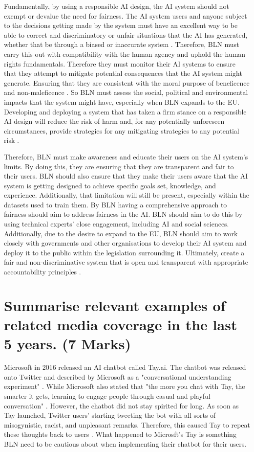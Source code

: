 \documentclass[a4paper,10pt]{article}
\begin{document}
	Fundamentally, by using a responsible AI design, the AI system should not exempt or devalue the need for fairness. The AI system users and anyone subject to the decisions getting made by the system must have an excellent way to be able to correct and discriminatory or unfair situations that the AI has generated, whether that be through a biased or inaccurate system \cite{adam_slides_regulating_ai}. Therefore, BLN must carry this out with compatibility with the human agency and uphold the human rights fundamentals. Therefore they must monitor their AI systems to ensure that they attempt to mitigate potential consequences that the AI system might generate. Ensuring that they are consistent with the moral purpose of beneficence and non-maleficence \cite{adam_slides_regulating_ai}. So BLN must assess the social, political and environmental impacts that the system might have, especially when BLN expands to the EU. Developing and deploying a system that has taken a firm stance on a responsible AI design will reduce the risk of harm and, for any potentially unforeseen circumstances, provide strategies for any mitigating strategies to any potential risk \cite{adam_slides_regulating_ai}.

	Therefore, BLN must make awareness and educate their users on the AI system's limits. By doing this, they are ensuring that they are transparent and fair to their users. BLN should also ensure that they make their users aware that the AI system is getting designed to achieve specific goals set, knowledge, and experience.  Additionally, that limitation will still be present, especially within the datasets used to train them. By BLN having a comprehensive approach to fairness should aim to address fairness in the AI. BLN should aim to do this by using technical experts' close engagement, including AI and social sciences. Additionally, due to the desire to expand to the EU, BLN should aim to work closely with governments and other organisations to develop their AI system and deploy it to the public within the legislation surrounding it. Ultimately, create a fair and non-discriminative system that is open and transparent with appropriate accountability principles \cite{adam_slides_regulating_ai}.


\section{Summarise relevant examples of related media coverage in the last 5 years. (7 Marks)}

	Microsoft in 2016 released an AI chatbot called Tay.ai. The chatbot was released onto Twitter and described by Microsoft as a "conversational understanding experiment" \cite{msft_twit_ai}. While Microsoft also stated that "the more you chat with Tay, the smarter it gets, learning to engage people through casual and playful conversation" \cite{msft_twit_ai}. However, the chatbot did not stay spirited for long. As soon as Tay launched, Twitter users' starting tweeting the bot with all sorts of misogynistic, racist, and unpleasant remarks. Therefore, this caused Tay to repeat these thoughts back to users \cite{msft_twit_ai}. What happened to Microsft's Tay is something BLN need to be cautious about when implementing their chatbot for their users.
	
\end{document}
